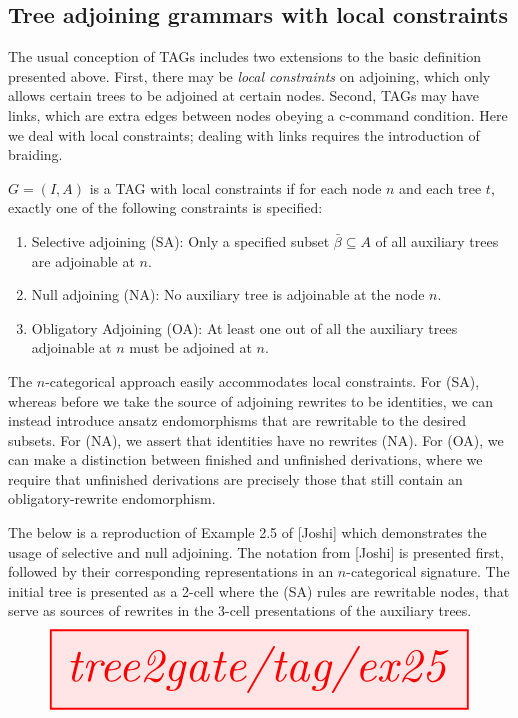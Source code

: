 \begin{fullwidth}
\subsection{Tree adjoining grammars with local constraints}

The usual conception of TAGs includes two extensions to the basic definition presented above. First, there may be \emph{local constraints} on adjoining, which only allows certain trees to be adjoined at certain nodes. Second, TAGs may have links, which are extra edges between nodes obeying a c-command condition. Here we deal with local constraints; dealing with links requires the introduction of braiding.

\begin{defn}
$G = (I,A)$ is a TAG with local constraints if for each node $n$ and each tree $t$, exactly one of the following constraints is specified:
\begin{enumerate}
\item{Selective adjoining (SA): Only a specified subset $\bar{\beta} \subseteq A$ of all auxiliary trees are adjoinable at $n$.}
\item{Null adjoining (NA): No auxiliary tree is adjoinable at the node $n$.}
\item{Obligatory Adjoining (OA): At least one out of all the auxiliary trees adjoinable at $n$ must be adjoined at $n$.}
\end{enumerate}
\end{defn}

The $n$-categorical approach easily accommodates local constraints. For (SA), whereas before we take the source of adjoining rewrites to be identities, we can instead introduce ansatz endomorphisms that are rewritable to the desired subsets. For (NA), we assert that identities have no rewrites (NA). For (OA), we can make a distinction between finished and unfinished derivations, where we require that unfinished derivations are precisely those that still contain an obligatory-rewrite endomorphism.

\begin{example}
The below is a reproduction of Example 2.5 of [Joshi] which demonstrates the usage of selective and null adjoining. The notation from [Joshi] is presented first, followed by their corresponding representations in an $n$-categorical signature. The initial tree is presented as a 2-cell where the (SA) rules are rewritable nodes, that serve as sources of rewrites in the 3-cell presentations of the auxiliary trees.
\[\resizebox{\textwidth}{!}{\tikzfig{tree2gate/tag/ex25}}\]
\end{example}


\end{fullwidth}
